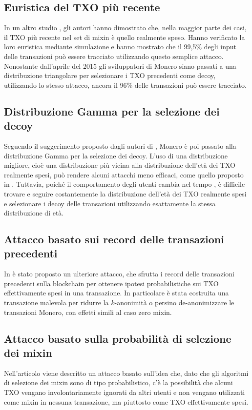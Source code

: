 \subsection{Euristica del TXO più recente}
In un altro studio \cite{art:2}, gli autori hanno dimostrato che, nella maggior parte dei casi, il TXO più recente nel set di mixin è quello realmente speso. Hanno verificato la loro euristica mediante simulazione e hanno mostrato che il 99,5\% degli input delle transazioni può essere tracciato utilizzando questo semplice attacco. Nonostante dall'aprile del 2015 gli sviluppatori di Monero siano passati a una distribuzione triangolare per selezionare i TXO precedenti come decoy, utilizzando lo stesso attacco, ancora il 96\% delle transazioni può essere tracciato.

\subsection{Distribuzione Gamma per la selezione dei decoy}
Seguendo il suggerimento proposto dagli autori di \cite{art:4}, Monero è poi passato alla distribuzione Gamma per la selezione dei decoy. L'uso di una distribuzione migliore, cioè una distribuzione più vicina alla distribuzione dell'età dei TXO realmente spesi, può rendere alcuni attacchi meno efficaci, come quello proposto in \cite{art:2}. Tuttavia, poiché il comportamento degli utenti cambia nel tempo \cite{art:7}, è difficile trovare e seguire costantemente la distribuzione dell'età dei TXO realmente spesi e selezionare i decoy delle transazioni utilizzando esattamente la stessa distribuzione di età.

\subsection{Attacco basato sui record delle transazioni precedenti}
In \cite{art:5} è stato proposto un ulteriore attacco, che sfrutta i record delle transazioni precedenti sulla blockchain per ottenere ipotesi probabilistiche sui TXO effettivamente spesi in una transazione. In particolare è stata costruita una transazione malevola per ridurre la $k$-anonimità o persino de-anonimizzare le transazioni Monero, con effetti simili al caso zero mixin.

\subsection{Attacco basato sulla probabilità di selezione dei mixin}
Nell'articolo \cite{art:new} viene descritto un attacco basato sull'idea che, dato che gli algoritmi di selezione dei mixin sono di tipo probabilistico, c'è la possibilità che alcuni TXO vengano involontariamente ignorati da altri utenti e non vengano utilizzati come mixin in nessuna transazione, ma piuttosto come TXO effettivamente spesi.

